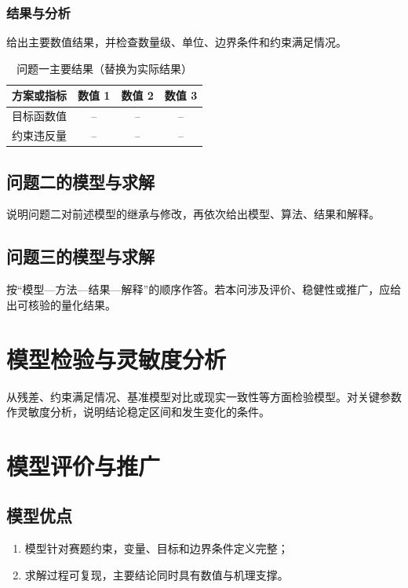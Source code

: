 \documentclass[withoutpreface,bwprint]{cumcmthesis}
\begin{document}
\subsubsection{结果与分析}

给出主要数值结果，并检查数量级、单位、边界条件和约束满足情况。

\begin{table}[htbp]
  \centering
  \caption{问题一主要结果（替换为实际结果）}
  \label{tab:q1}
  \begin{tabular}{lccc}
    \toprule
    方案或指标 & 数值 1 & 数值 2 & 数值 3 \\
    \midrule
    目标函数值 & -- & -- & -- \\
    约束违反量 & -- & -- & -- \\
    \bottomrule
  \end{tabular}
\end{table}

\subsection{问题二的模型与求解}

说明问题二对前述模型的继承与修改，再依次给出模型、算法、结果和解释。

\subsection{问题三的模型与求解}

按“模型—方法—结果—解释”的顺序作答。若本问涉及评价、稳健性或推广，应给出可核验的量化结果。

\section{模型检验与灵敏度分析}

从残差、约束满足情况、基准模型对比或现实一致性等方面检验模型。对关键参数作灵敏度分析，说明结论稳定区间和发生变化的条件。

\section{模型评价与推广}

\subsection{模型优点}

\begin{enumerate}
  \item 模型针对赛题约束，变量、目标和边界条件定义完整；
  \item 求解过程可复现，主要结论同时具有数值与机理支撑。
\end{enumerate}
\end{document}
